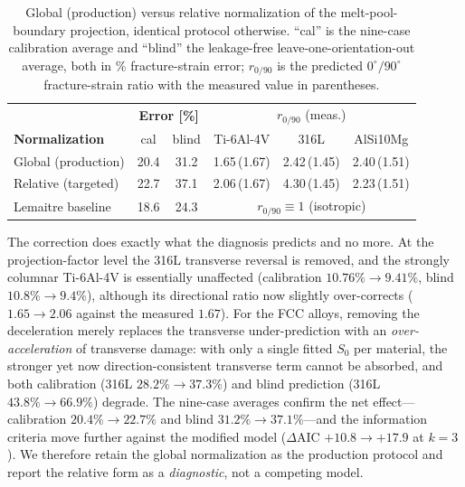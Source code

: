 \documentclass[11pt,a4paper,twocolumn]{article}
\begin{document}
\begin{table}[htbp]
\centering
\caption{Global (production) versus relative normalization of the melt-pool-boundary projection, identical protocol otherwise. ``cal'' is the nine-case calibration average and ``blind'' the leakage-free leave-one-orientation-out average, both in \% fracture-strain error; $r_{0/90}$ is the predicted $0^\circ/90^\circ$ fracture-strain ratio with the measured value in parentheses.}
\label{tab:rel_norm}
\footnotesize
\setlength{\tabcolsep}{4pt}
\begin{tabular}{l cc ccc}
\toprule
 & \multicolumn{2}{c}{\textbf{Error [\%]}} & \multicolumn{3}{c}{$r_{0/90}$ (meas.)} \\
\textbf{Normalization} & cal & blind & Ti-6Al-4V & 316L & AlSi10Mg \\
\midrule
Global (production)   & 20.4 & 31.2 & 1.65\,(1.67) & 2.42\,(1.45) & 2.40\,(1.51) \\
Relative (targeted)   & 22.7 & 37.1 & 2.06\,(1.67) & 4.30\,(1.45) & 2.23\,(1.51) \\
\midrule
Lemaitre baseline     & 18.6 & 24.3 & \multicolumn{3}{c}{$r_{0/90}\equiv1$ (isotropic)} \\
\bottomrule
\end{tabular}
\end{table}

The correction does exactly what the diagnosis predicts and no more. At the projection-factor level the 316L transverse reversal is removed, and the strongly columnar Ti-6Al-4V is essentially unaffected (calibration $10.76\%\to9.41\%$, blind $10.8\%\to9.4\%$), although its directional ratio now slightly over-corrects ($1.65\to2.06$ against the measured $1.67$). For the FCC alloys, removing the deceleration merely replaces the transverse under-prediction with an \emph{over-acceleration} of transverse damage: with only a single fitted $S_0$ per material, the stronger yet now direction-consistent transverse term cannot be absorbed, and both calibration (316L $28.2\%\to37.3\%$) and blind prediction (316L $43.8\%\to66.9\%$) degrade. The nine-case averages confirm the net effect---calibration $20.4\%\to22.7\%$ and blind $31.2\%\to37.1\%$---and the information criteria move further against the modified model ($\Delta\mathrm{AIC}$ $+10.8\to+17.9$ at $k=3$). We therefore retain the global normalization as the production protocol and report the relative form as a \emph{diagnostic}, not a competing model.
\end{document}
